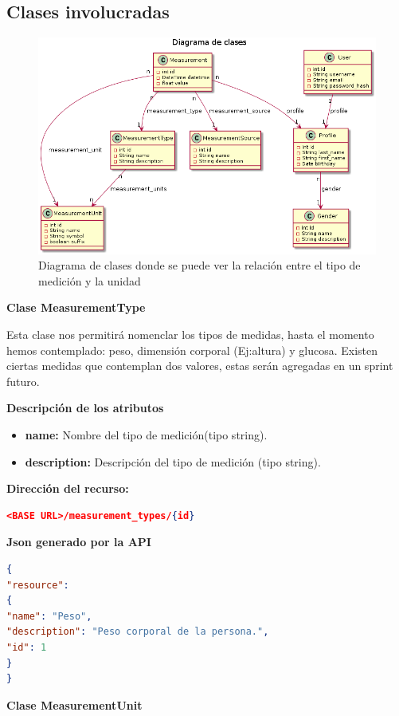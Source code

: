 \documentclass[a4paper,12pt]{article}
\begin{document}
\subsection{Clases involucradas}
\label{3-clases_involucradas}
\begin{figure}[h!]
	\centering
	\includegraphics[width=.8\textwidth]{img/3-diagramaClases_relacionTipos}
	\caption{Diagrama de clases donde se puede ver la relación entre el tipo de medición y la unidad}
	\label{relacion_tipo}
\end{figure}


\textbf{ Clase MeasurementType }

Esta clase nos permitirá  nomenclar  los tipos de medidas, hasta el momento hemos contemplado: peso, dimensión corporal (Ej:altura) y glucosa. Existen ciertas medidas que contemplan dos valores, estas serán agregadas en un sprint futuro.

\textbf{Descripción de los atributos}
\begin{itemize}
	\item \textbf{name: }	Nombre del tipo de medición(tipo string).
	\item \textbf{description:} Descripción del tipo de medición (tipo string).
\end{itemize}

\textbf{Dirección del recurso:}
\begin{lstlisting}[language=json,firstnumber=1]
<BASE URL>/measurement_types/{id}
\end{lstlisting}

\textbf{Json generado por la API} 
\begin{lstlisting}[language=json,firstnumber=1]
{
"resource": 
{
"name": "Peso",
"description": "Peso corporal de la persona.",
"id": 1
}
}
\end{lstlisting}

\textbf{ Clase MeasurementUnit }
\end{document}
